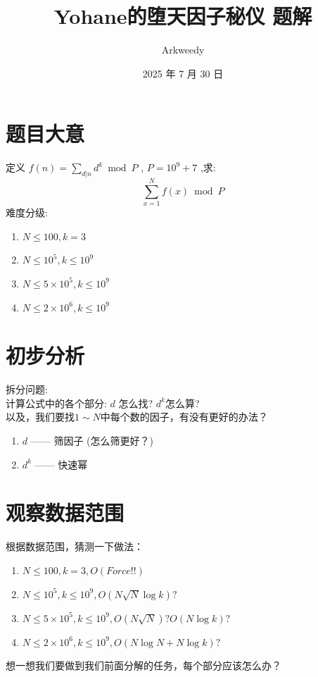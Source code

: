 \documentclass[11pt]{beamer}
\title{Yohane的堕天因子秘仪 题解}
\author{Arkweedy}
\date{2025 年 7 月 30 日}
\begin{document}
\begin{frame}
  \titlepage
\end{frame}



\section{题目大意}
\begin{frame}
定义 $f(n) = \sum_{d | n}d^k \bmod P$ , $P = 10^9 + 7$ ,求:\\
$$\sum_{x = 1}^N f(x) \bmod P$$
难度分级:\\
\begin{enumerate}
    \item $N \leq 100, k = 3$ %
    \item $N \leq 10^5, k \leq 10^9$ %
    \item $N \leq 5\times 10^5, k \leq 10^9$ %
    \item $N \leq 2\times 10^6, k \leq 10^9$ %
\end{enumerate}
\end{frame}

\section{初步分析}
\begin{frame}
拆分问题:\\
计算公式中的各个部分: $d$ 怎么找? $d^k$怎么算? \\
以及，我们要找$1 \sim N$中每个数的因子，有没有更好的办法？\\
\begin{enumerate}
    \item $d$ —— 筛因子 (怎么筛更好？)
    \item $d^k$ —— 快速幂  
\end{enumerate}
\end{frame}

\section{观察数据范围}
\begin{frame}
根据数据范围，猜测一下做法：
\begin{enumerate}
    \item $N \leq 100, k = 3, O(Force!!)$  %
    \item $N \leq 10^5, k \leq 10^9, O(N\sqrt N \log k) ?$ %
    \item $N \leq 5\times 10^5, k \leq 10^9, O(N\sqrt N )?O( N \log k )?$ %
    \item $N \leq 2\times 10^6, k \leq 10^9, O(N \log N + N \log k)?$ %
\end{enumerate}
想一想我们要做到我们前面分解的任务，每个部分应该怎么办？
\end{frame}
\end{document}
